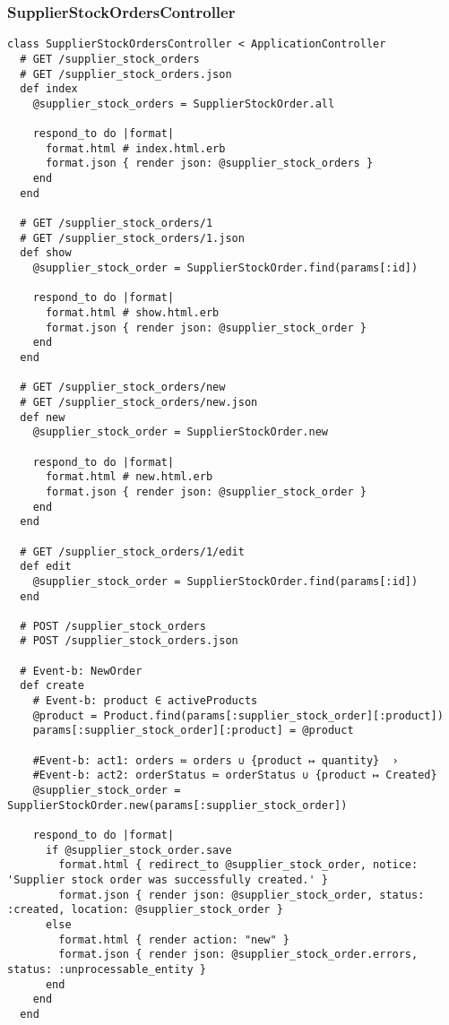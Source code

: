 \documentclass[a4paper]{article}
\begin{document}
\subsubsection{SupplierStockOrdersController}
\begin{verbatim}
class SupplierStockOrdersController < ApplicationController
  # GET /supplier_stock_orders
  # GET /supplier_stock_orders.json
  def index
    @supplier_stock_orders = SupplierStockOrder.all

    respond_to do |format|
      format.html # index.html.erb
      format.json { render json: @supplier_stock_orders }
    end
  end

  # GET /supplier_stock_orders/1
  # GET /supplier_stock_orders/1.json
  def show
    @supplier_stock_order = SupplierStockOrder.find(params[:id])

    respond_to do |format|
      format.html # show.html.erb
      format.json { render json: @supplier_stock_order }
    end
  end

  # GET /supplier_stock_orders/new
  # GET /supplier_stock_orders/new.json
  def new
    @supplier_stock_order = SupplierStockOrder.new

    respond_to do |format|
      format.html # new.html.erb
      format.json { render json: @supplier_stock_order }
    end
  end

  # GET /supplier_stock_orders/1/edit
  def edit
    @supplier_stock_order = SupplierStockOrder.find(params[:id])
  end

  # POST /supplier_stock_orders
  # POST /supplier_stock_orders.json

  # Event-b: NewOrder
  def create
    # Event-b: product ∈ activeProducts
    @product = Product.find(params[:supplier_stock_order][:product])
    params[:supplier_stock_order][:product] = @product
   
    #Event-b: act1: orders ≔ orders ∪ {product ↦ quantity}  ›
    #Event-b: act2: orderStatus ≔ orderStatus ∪ {product ↦ Created}
    @supplier_stock_order = SupplierStockOrder.new(params[:supplier_stock_order])

    respond_to do |format|
      if @supplier_stock_order.save
        format.html { redirect_to @supplier_stock_order, notice: 'Supplier stock order was successfully created.' }
        format.json { render json: @supplier_stock_order, status: :created, location: @supplier_stock_order }
      else
        format.html { render action: "new" }
        format.json { render json: @supplier_stock_order.errors, status: :unprocessable_entity }
      end
    end
  end


\end{verbatim}
\end{document}
